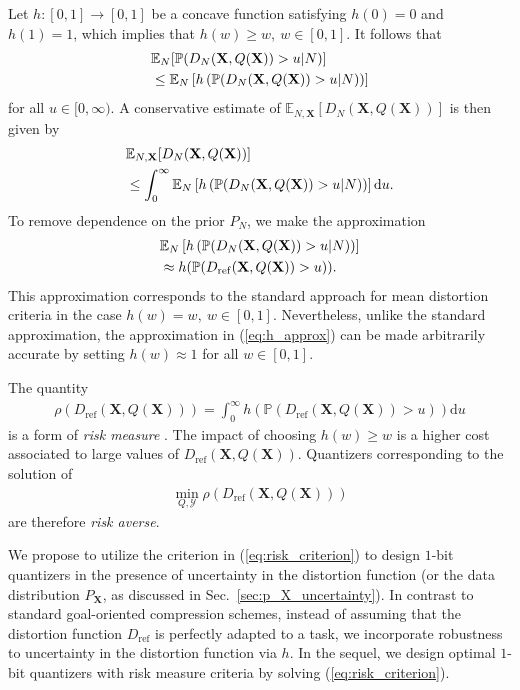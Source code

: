 \documentclass[conference]{IEEEtran}
\begin{document}
Let $h: [0,1] \rightarrow [0,1]$ be a concave function satisfying $h(0) = 0$ and $h(1) = 1$, which implies that $h(w) \geq w,~w \in [0,1]$. It follows that
\begin{align}
	&\mathbb{E}_N[\mathbb{P}(D_N(\mathbf{X},Q(\mathbf{X})) > u|N)]\notag\\
	&\leq \mathbb{E}_N\left[h\left(\mathbb{P}(D_N(\mathbf{X},Q(\mathbf{X})) > u|N)\right)\right]
\end{align}
for all $u \in [0,\infty)$. A conservative estimate of $\mathbb{E}_{N,\mathbf{X}}[D_N(\mathbf{X},Q(\mathbf{X}))]$ is then given by 
\begin{align}
	&\mathbb{E}_{N,\mathbf{X}}[D_N(\mathbf{X},Q(\mathbf{X}))]\notag\\ 
	&\leq \int_0^{\infty} \mathbb{E}_N\left[h\left(\mathbb{P}(D_N(\mathbf{X},Q(\mathbf{X})) > u|N)\right)\right]\mathrm{d}u.
\end{align}
To remove dependence on the prior $P_N$, we make the approximation 
\begin{align}\label{eq:h_approx}
	&\mathbb{E}_N\left[h\left(\mathbb{P}(D_N(\mathbf{X},Q(\mathbf{X})) > u|N)\right)\right]\notag\\
	&\approx h(\mathbb{P}(D_{\mathrm{ref}}(\mathbf{X},Q(\mathbf{X})) > u)).
\end{align}
This approximation corresponds to the standard approach for mean distortion criteria in the case $h(w) = w,~w \in [0,1]$. Nevertheless, unlike the standard approximation, the approximation in (\ref{eq:h_approx}) can be made arbitrarily accurate by setting $h(w) \approx 1$ for all $w \in [0,1]$. 

The quantity 
\begin{align}
	\rho(D_{\mathrm{ref}}(\mathbf{X},Q(\mathbf{X}))) = \int_0^{\infty} h(\mathbb{P}(D_{\mathrm{ref}}(\mathbf{X},Q(\mathbf{X})) > u))\mathrm{d}u
\end{align}
is a form of \textit{risk measure} \cite{Serada2010distortion}. The impact of choosing $h(w) \geq w$ is a higher cost associated to large values of $D_{\mathrm{ref}}(\mathbf{X},Q(\mathbf{X}))$. Quantizers corresponding to the solution of 
\begin{align}\label{eq:risk_criterion}
	\min_{Q,\mathcal{Y}} 	\rho(D_{\mathrm{ref}}(\mathbf{X},Q(\mathbf{X})))
\end{align} 
are therefore \textit{risk averse}. 

We propose to utilize the criterion in (\ref{eq:risk_criterion}) to design $1$-bit quantizers in the presence of uncertainty in the distortion function (or the data distribution $P_{\mathbf{X}}$, as discussed in Sec.~\ref{sec:p_X_uncertainty}). In contrast to standard goal-oriented compression schemes, instead of assuming that the distortion function $D_{\mathrm{ref}}$ is perfectly adapted to a task, we incorporate robustness to uncertainty in the distortion function via $h$. In the sequel, we design optimal $1$-bit quantizers with risk measure criteria by solving (\ref{eq:risk_criterion}). 
\end{document}
